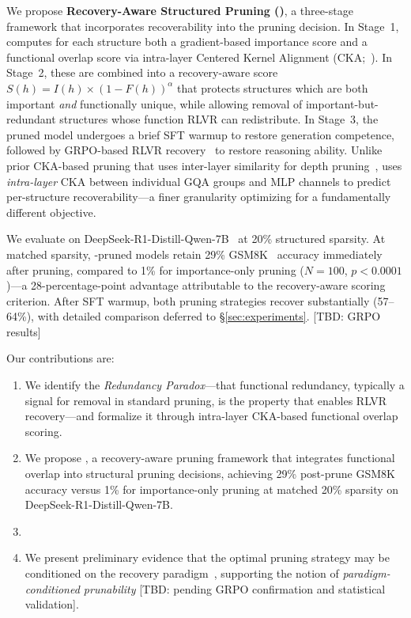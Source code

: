 We propose \textbf{Recovery-Aware Structured Pruning (\rasp{})}, a three-stage framework that incorporates recoverability into the pruning decision.
In Stage~1, \rasp{} computes for each structure both a gradient-based importance score and a functional overlap score via intra-layer Centered Kernel Alignment (CKA;~\citealp{kornblith2019cka}).
In Stage~2, these are combined into a recovery-aware score $S(h) = I(h) \times (1 - F(h))^\alpha$ that protects structures which are both important \emph{and} functionally unique, while allowing removal of important-but-redundant structures whose function RLVR can redistribute.
In Stage~3, the pruned model undergoes a brief SFT warmup to restore generation competence, followed by GRPO-based RLVR recovery~\citep{shao2024grpo} to restore reasoning ability.
Unlike prior CKA-based pruning that uses inter-layer similarity for depth pruning~\citep{mpruner2024,lachance2024cka}, \rasp{} uses \emph{intra-layer} CKA between individual GQA groups and MLP channels to predict per-structure recoverability---a finer granularity optimizing for a fundamentally different objective.

We evaluate \rasp{} on DeepSeek-R1-Distill-Qwen-7B~\citep{deepseek2025r1} at 20\% structured sparsity.
At matched sparsity, \rasp{}-pruned models retain 29\% GSM8K~\citep{cobbe2021gsm8k} accuracy immediately after pruning, compared to 1\% for importance-only pruning ($N{=}100$, $p{<}0.0001$)---a 28-percentage-point advantage attributable to the recovery-aware scoring criterion.
After SFT warmup, both pruning strategies recover substantially (57--64\%), with detailed comparison deferred to \S\ref{sec:experiments}.
[TBD: GRPO results]

Our contributions are:
\begin{enumerate}[nosep,leftmargin=*]
    \item We identify the \emph{Redundancy Paradox}---that functional redundancy, typically a signal for removal in standard pruning, is the property that enables RLVR recovery---and formalize it through intra-layer CKA-based functional overlap scoring.
    \item We propose \rasp{}, a recovery-aware pruning framework that integrates functional overlap into structural pruning decisions, achieving 29\% post-prune GSM8K accuracy versus 1\% for importance-only pruning at matched 20\% sparsity on DeepSeek-R1-Distill-Qwen-7B.
    \item [TBD: GRPO recovery results---contribution demonstrating that \rasp{}'s post-prune advantage translates to superior post-RLVR reasoning performance.]
    \item We present preliminary evidence that the optimal pruning strategy may be conditioned on the recovery paradigm~\citep{frankle2019lth}, supporting the notion of \emph{paradigm-conditioned prunability} [TBD: pending GRPO confirmation and statistical validation].
\end{enumerate}
